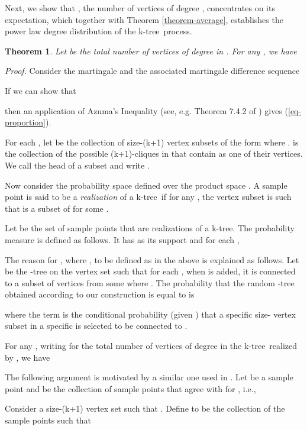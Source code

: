 \documentclass[11pt]{article}
\newtheorem{theorem}{Theorem}[section]
\newenvironment{proof}[0]{\textit{Proof.} }{\hfill   }
\providecommand{\ktree}{k-tree}
\begin{document}
Next, we show that , the number of vertices of degree , concentrates on its expectation,  which together with
Theorem \ref{theorem-average}, establishes the power law degree distribution of the \ktree\ process.


\begin{theorem}
\label{theorem-proportion}
Let  be the total number of vertices of degree  in . For any , we have

\end{theorem}
\begin{proof}
Consider the martingale  and the associated martingale difference sequence

If we can show that

then an application of Azuma's Inequality (see, e.g. Theorem 7.4.2 of \cite{alon00}) gives   (\ref{eq-proportion}).

For each , let
 be the collection of size-(k+1) vertex subsets  of the form  where
.  is the collection of the possible (k+1)-cliques in  that
contain  as one of their vertices. We call  the head of a subset  and write .

Now consider the probability space  defined over the product space
. A sample point  is
said to be a \textit{realization} of a \ktree\ if for any , the vertex subset
 is such that  is a subset
of  for some .

Let  be the set of sample points that are realizations of a \ktree.
The probability measure  is defined as follows. It
has  as its support and for each ,

The reason for , where , to be defined as in the above is explained  
as follows. Let  be the -tree on the vertex set  such that
for each , when  is added, it is connected to
a subset of  vertices from some  where .    
The probability that the random -tree  obtained according to our construction
is equal to  is
 
where the term  is the conditional probability 
(given ) that a specific size- vertex subset in a specific 
is selected to be connected to .  


For any , writing   for the total number of vertices of degree 
in the \ktree\ realized by , we have


The following argument is motivated by a similar one used in \cite{cooper03}.
Let  be a sample point and
 be the collection of sample points that agree with
 for , i.e.,


Consider a size-(k+1) vertex set  such that
. Define  to be the collection of the sample points
 such that


\end{proof}
\end{document}
